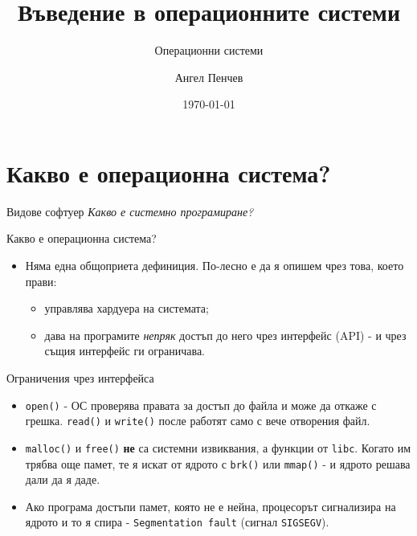 \documentclass[14pt, aspectratio=169]{beamer}
\title{Въведение в операционните системи}
\subtitle{Операционни системи}
\author{Ангел Пенчев}
\institute{ТУЕС, XI\textsuperscript{А}}
\date{\today}
\begin{document}
\begin{frame}
  \tableofcontents
\end{frame}

\section{Какво е операционна система?}

\begin{frame}{Видове софтуер}
  \emph{Какво е системно програмиране?}
  \bigskip

\end{frame}

\begin{frame}{Какво е операционна система?}
  \begin{itemize}
    \item Няма една общоприета дефиниция. По-лесно е да я опишем чрез това,
      което прави:
      \begin{itemize}
        \item управлява хардуера на системата;
        \item дава на програмите \emph{непряк} достъп до него чрез интерфейс
          (API) - и чрез същия интерфейс ги ограничава.
      \end{itemize}
  \end{itemize}
\end{frame}

\begin{frame}{Ограничения чрез интерфейса}
  \begin{itemize}
    \item \texttt{open()} - ОС проверява правата за достъп до файла и може да
      откаже с грешка. \texttt{read()} и \texttt{write()} после работят само с
      вече отворения файл.
    \item \texttt{malloc()} и \texttt{free()} \textbf{не} са системни
      извиквания, а функции от \texttt{libc}. Когато им трябва още памет, те я
      искат от ядрото с \texttt{brk()} или \texttt{mmap()} - и ядрото решава
      дали да я даде.
    \item Ако програма достъпи памет, която не е нейна, процесорът сигнализира
      на ядрото и то я спира - \texttt{Segmentation fault} (сигнал
      \texttt{SIGSEGV}).
  \end{itemize}
\end{frame}
\end{document}
